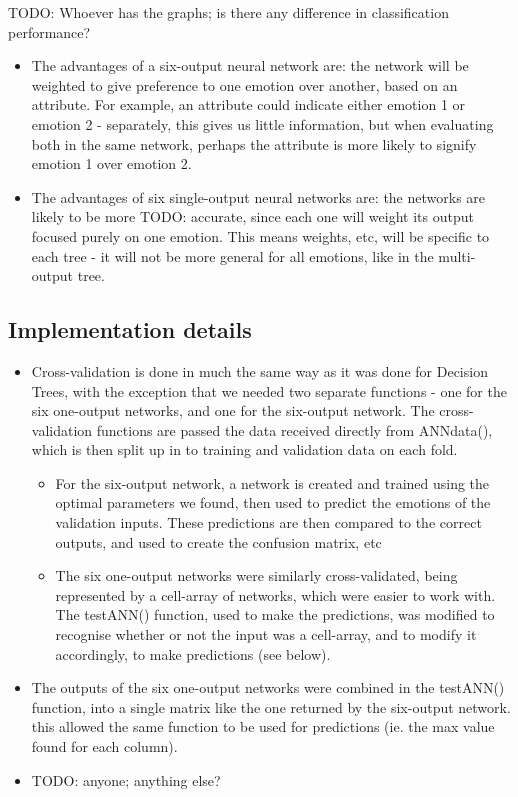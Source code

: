 \documentclass[12pt]{article}
\begin{document}
TODO: Whoever has the graphs; is there any difference in classification performance? \\
\begin{itemize}
  \item The advantages of a six-output neural network are: the network will be weighted to give preference to one emotion over another, based on an attribute. For example, an attribute could indicate either emotion 1 or emotion 2 - separately, this gives us little information, but when evaluating both in the same network, perhaps the attribute is more likely to signify emotion 1 over emotion 2.
  \item The advantages of six single-output neural networks are: the networks are likely to be more TODO: accurate, since each one will weight its output focused purely on one emotion. This means weights, etc, will be specific to each tree - it will not be more general for all emotions, like in the multi-output tree.
\end{itemize}


\subsection*{Implementation details}
\begin{itemize}
  \item Cross-validation is done in much the same way as it was done for Decision Trees, with the exception that we needed two separate functions - one for the six one-output networks, and one for the six-output network. The cross-validation functions are passed the data received directly from ANNdata(), which is then split up in to training and validation data on each fold.
  \begin{itemize}
    \item For the six-output network, a network is created and trained using the optimal parameters we found, then used to predict the emotions of the validation inputs. These predictions are then compared to the correct outputs, and used to create the confusion matrix, etc
    \item The six one-output networks were similarly cross-validated, being represented by a cell-array of networks, which were easier to work with. The testANN() function, used to make the predictions, was modified to recognise whether or not the input was a cell-array, and to modify it accordingly, to make predictions (see below).
  \end{itemize}
  \item The outputs of the six one-output networks were combined in the testANN() function, into a single matrix like the one returned by the six-output network. this allowed the same function to be used for predictions (ie. the max value found for each column).
  \item TODO: anyone; anything else?
\end{itemize}
\end{document}
